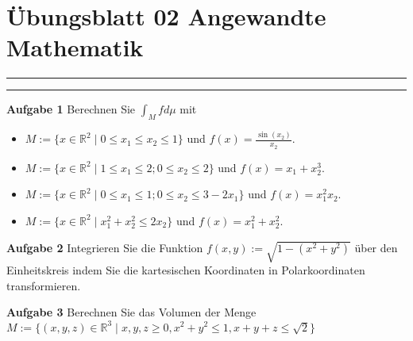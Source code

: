 \documentclass[a4paper,13pt]{scrartcl}
\begin{document}
\section*{\large  Übungsblatt 02 \hfill Angewandte Mathematik }
\hrule
\hrule
\vspace{4mm}
{\bf Aufgabe 1}
Berechnen Sie $\int_M f d \mu$ mit 
\begin{itemize}
\item $M := \{ x \in \mathbb{R}^2 \; | \; 0 \leq x_1 \leq x_2 \leq 1 \}$ und $f(x) = \frac{\sin(x_2)}{x_2}$.
\item $M := \{ x \in \mathbb{R}^2 \; | \; 1 \leq x_1  \leq 2; 0 \leq x_2 \leq 2 \}$ und $f(x) =x_1 +  x_2^3$.
\item $M := \{ x \in \mathbb{R}^2 \; | \; 0 \leq x_1  \leq 1; 0 \leq x_2 \leq 3 -2x_1 \}$ und $f(x) =x_1^2 x_2$.
\item $M := \{ x \in \mathbb{R}^2 \; | \;  x_1^2 + x_2^2 \leq 2 x_2\}$ und $f(x) =  x_1^2 + x_2^2$.
\end{itemize}
\vspace{8mm}

{\bf Aufgabe 2}
Integrieren Sie die Funktion $f(x,y) := \sqrt{1 - (x^2 + y^2)}$ über den Einheitskreis indem Sie die kartesischen Koordinaten in Polarkoordinaten transformieren. 


{\bf Aufgabe 3}
Berechnen Sie das Volumen der Menge $M := \{ (x,y,z) \in \mathbb{R}^3 \; | \; x,y,z \geq 0 , x^2 +y^2 \leq 1, x +y+z \leq \sqrt{2}\}$ 
\end{document}
